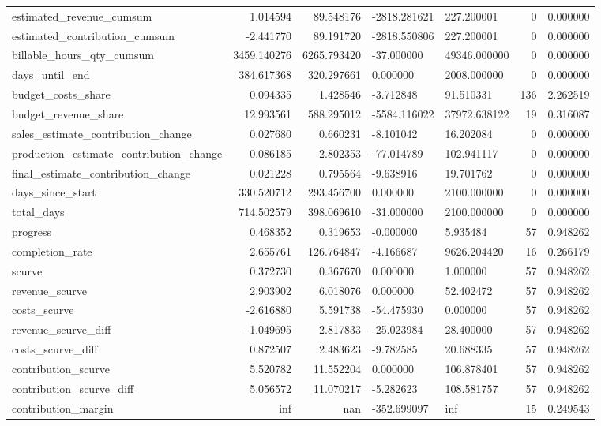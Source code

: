 \begin{landscape}
\begin{longtable}[h!]{lrrllrr}
estimated_revenue_cumsum & 1.014594 & 89.548176 & -2818.281621 & 227.200001 & 0 & 0.000000 \\
estimated_contribution_cumsum & -2.441770 & 89.191720 & -2818.550806 & 227.200001 & 0 & 0.000000 \\
billable_hours_qty_cumsum & 3459.140276 & 6265.793420 & -37.000000 & 49346.000000 & 0 & 0.000000 \\
days_until_end & 384.617368 & 320.297661 & 0.000000 & 2008.000000 & 0 & 0.000000 \\
budget_costs_share & 0.094335 & 1.428546 & -3.712848 & 91.510331 & 136 & 2.262519 \\
budget_revenue_share & 12.993561 & 588.295012 & -5584.116022 & 37972.638122 & 19 & 0.316087 \\
sales_estimate_contribution_change & 0.027680 & 0.660231 & -8.101042 & 16.202084 & 0 & 0.000000 \\
production_estimate_contribution_change & 0.086185 & 2.802353 & -77.014789 & 102.941117 & 0 & 0.000000 \\
final_estimate_contribution_change & 0.021228 & 0.795564 & -9.638916 & 19.701762 & 0 & 0.000000 \\
days_since_start & 330.520712 & 293.456700 & 0.000000 & 2100.000000 & 0 & 0.000000 \\
total_days & 714.502579 & 398.069610 & -31.000000 & 2100.000000 & 0 & 0.000000 \\
progress & 0.468352 & 0.319653 & -0.000000 & 5.935484 & 57 & 0.948262 \\
completion_rate & 2.655761 & 126.764847 & -4.166687 & 9626.204420 & 16 & 0.266179 \\
scurve & 0.372730 & 0.367670 & 0.000000 & 1.000000 & 57 & 0.948262 \\
revenue_scurve & 2.903902 & 6.018076 & 0.000000 & 52.402472 & 57 & 0.948262 \\
costs_scurve & -2.616880 & 5.591738 & -54.475930 & 0.000000 & 57 & 0.948262 \\
revenue_scurve_diff & -1.049695 & 2.817833 & -25.023984 & 28.400000 & 57 & 0.948262 \\
costs_scurve_diff & 0.872507 & 2.483623 & -9.782585 & 20.688335 & 57 & 0.948262 \\
contribution_scurve & 5.520782 & 11.552204 & 0.000000 & 106.878401 & 57 & 0.948262 \\
contribution_scurve_diff & 5.056572 & 11.070217 & -5.282623 & 108.581757 & 57 & 0.948262 \\
contribution_margin & inf & nan & -352.699097 & inf & 15 & 0.249543 \\

\end{longtable}
\end{landscape}
